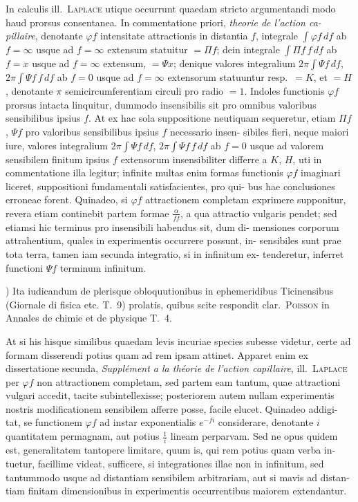 \documentclass[12pt,a4paper]{article}
\theoremstyle{gauss}
\begin{document}
In calculis ill.~\textsc{Laplace} utique occurrunt quaedam stricto argumentandi
modo haud prorsus consentanea. In commentatione priori, \textit{theorie de l'action ca-
pillaire}, denotante $\varphi f$ intensitate attractionis in distantia $f$, integrale $\int\varphi f\,df$
ab $f=\infty$ usque ad $f=\infty$ extensum statuitur $=\Pi f$; dein integrale $\int\Pi f\,f\,df$
ab $f=x$ usque ad $f=\infty$ extensum, $=\Psi x$; denique valores integralium
$2\pi\int\Psi f\,df$, $2\pi\int\Psi f\,f\,df$ ab $f=0$ usque ad $f=\infty$ extensorum statuuntur
resp.~$=K$, et $=H$, denotante $\pi$ semicircumferentiam circuli pro radio $=1$.
Indoles functionis $\varphi f$ prorsus intacta linquitur, dummodo insensibilis sit pro
omnibus valoribus sensibilibus ipsius $f$. At ex hac sola suppositione neutiquam
sequeretur, etiam $\Pi f$, $\Psi f$ pro valoribus sensibilibus ipsius $f$ necessario insen-
sibiles fieri, neque maiori iure, valores integralium $2\pi\int\Psi f\,df$, $2\pi\int\Psi f\,f\,df$
ab $f=0$ usque ad valorem sensibilem finitum ipsius $f$ extensorum insensibiliter
differre a $K$, $H$, uti in commentatione illa legitur; infinite multas enim formas
functionis $\varphi f$ imaginari liceret, suppositioni fundamentali satisfacientes, pro qui-
bus hae conclusiones erroneae forent. Quinadeo, si $\varphi f$ attractionem completam
exprimere supponitur, revera etiam continebit partem formae $\frac{\alpha}{ff}$, a qua attractio
vulgaris pendet; sed etiamsi hic terminus pro insensibili habendus sit, dum di-
mensiones corporum attrahentium, quales in experimentis occurrere possunt, in-
sensibiles sunt prae tota terra, tamen iam secunda integratio, si in infinitum ex-
tenderetur, inferret functioni $\Psi f$ terminum infinitum.

\vspace{8pt}
{\footnotesize *) Ita iudicandum de plerisque obloquutionibus in ephemeridibus Ticinensibus (Giornale di fisica etc.
T.~9) prolatis, quibus scite respondit clar.~\textsc{Poisson} in Annales de chimie et de physique T.~4.}

\newpage
\setcounter{page}{34}

At si his hisque similibus quaedam levis incuriae species subesse videtur,
certe ad formam disserendi potius quam ad rem ipsam attinet. Apparet enim ex
dissertatione secunda, \textit{Suppl\'ement a la th\'eorie de l'action capillaire}, ill.~\textsc{Laplace}
per $\varphi f$ non attractionem completam, sed partem eam tantum, quae attractioni
vulgari accedit, tacite subintellexisse; posteriorem autem nullam experimentis
nostris modificationem sensibilem afferre posse, facile elucet. Quinadeo addigi-
tat, se functionem $\varphi f$ ad instar exponentialis $e^{-fi}$ considerare, denotante $i$
quantitatem permagnam, aut potius $\frac{1}{i}$ lineam perparvam. Sed ne opus quidem
est, generalitatem tantopere limitare, quum is, qui rem potius quam verba in-
tuetur, facillime videat, sufficere, si integrationes illae non in infinitum, sed
tantummodo usque ad distantiam sensibilem arbitrariam, aut si mavis ad distan-
tiam finitam dimensionibus in experimentis occurrentibus maiorem extendantur.
\end{document}
